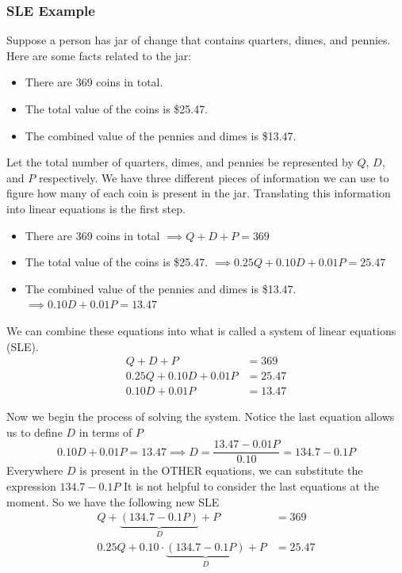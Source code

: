 \subsubsection*{SLE Example}
Suppose a person has jar of change that contains quarters, dimes, and pennies.  Here are some facts related to the jar:
\begin{itemize}
    \item There are 369 coins in total.
    \item The total value of the coins is \$25.47.
    \item The combined value of the pennies and dimes is \$13.47.
\end{itemize}
Let the total number of quarters, dimes, and pennies be represented by $Q$, $D$, and $P$ respectively.  We have three different pieces of information we can use to figure how many of each coin is present in the jar.  Translating this information into linear equations is the first step.
\begin{itemize}
    \item There are 369 coins in total $ \implies Q + D + P = 369$
    \item The total value of the coins is \$25.47. $\implies 0.25Q + 0.10D + 0.01P = 25.47$
    \item The combined value of the pennies and dimes is \$13.47.$ \implies 0.10D + 0.01P = 13.47$
\end{itemize}

We can combine these equations into what is called a system of linear equations (SLE).
\begin{align*}
    Q + D + P &= 369 \\
    0.25Q + 0.10D + 0.01P &= 25.47 \\
    0.10D + 0.01P &= 13.47
\end{align*}

Now we begin the process of solving the system. Notice the last equation allows us to define $D$ in terms of $P$
$$0.10D + 0.01P = 13.47 \implies D = \frac{13.47 - 0.01P}{0.10} = 134.7 - 0.1P$$
Everywhere $D$ is present in the OTHER equations, we can substitute the expression $134.7-0.1P$  It is not helpful to consider the last equations at the moment.  So we have the following new SLE 
\begin{align*}
    Q + \underbrace{(134.7-0.1P)}_{D} + P &= 369 \\
    0.25Q + 0.10\cdot \underbrace{(134.7-0.1P)}_{D} + P &= 25.47
\end{align*}

